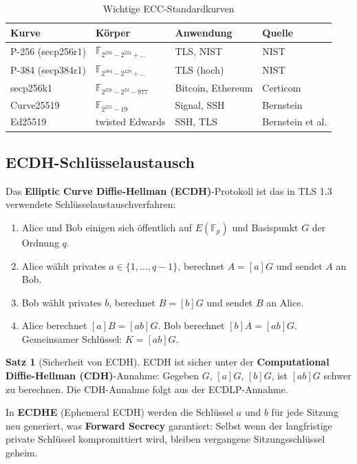 ﻿\documentclass[a4paper,12pt]{scrreprt}
\theoremstyle{definition}
\newtheorem{satz}{Satz}[section]
\begin{document}
\begin{table}[ht]
\centering
\caption{Wichtige ECC-Standardkurven}
\begin{tabular}{@{}llll@{}}
\toprule
\textbf{Kurve} & \textbf{Körper} & \textbf{Anwendung} & \textbf{Quelle} \\
\midrule
P-256 (secp256r1) & $\mathbb{F}_{2^{256}-2^{224}+\ldots}$ & TLS, NIST & NIST \\
P-384 (secp384r1) & $\mathbb{F}_{2^{384}-2^{128}+\ldots}$ & TLS (hoch) & NIST \\
secp256k1 & $\mathbb{F}_{2^{256}-2^{32}-977}$ & Bitcoin, Ethereum & Certicom \\
Curve25519 & $\mathbb{F}_{2^{255}-19}$ & Signal, SSH & Bernstein \\
Ed25519 & twisted Edwards & SSH, TLS & Bernstein et al. \\
\bottomrule
\end{tabular}
\end{table}

\subsection{ECDH-Schlüsselaustausch}

Das \textbf{Elliptic Curve Diffie-Hellman (ECDH)}-Protokoll \cite{Kob87,Mil86} ist das in TLS 1.3 \cite{Res18} verwendete Schlüsselaustauschverfahren:

\begin{enumerate}
    \item Alice und Bob einigen sich öffentlich auf $E(\mathbb{F}_p)$ und Basispunkt $G$ der Ordnung $q$.
    \item Alice wählt privates $a \in \{1,\ldots,q-1\}$, berechnet $A = [a]G$ und sendet $A$ an Bob.
    \item Bob wählt privates $b$, berechnet $B = [b]G$ und sendet $B$ an Alice.
    \item Alice berechnet $[a]B = [ab]G$. Bob berechnet $[b]A = [ab]G$. Gemeinsamer Schlüssel: $K = [ab]G$.
\end{enumerate}

\begin{satz}[Sicherheit von ECDH]
ECDH ist sicher unter der \textbf{Computational Diffie-Hellman (CDH)}-Annahme: Gegeben $G$, $[a]G$, $[b]G$, ist $[ab]G$ schwer zu berechnen. Die CDH-Annahme folgt aus der ECDLP-Annahme.
\end{satz}

In \textbf{ECDHE} (Ephemeral ECDH) werden die Schlüssel $a$ und $b$ für jede Sitzung neu generiert, was \textbf{Forward Secrecy} garantiert: Selbst wenn der langfristige private Schlüssel kompromittiert wird, bleiben vergangene Sitzungsschlüssel geheim.
\end{document}
